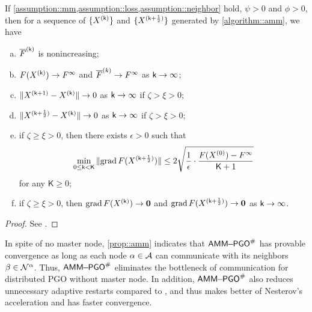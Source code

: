 \begin{prop}\label{prop::amm}
	{\highlight If \cref{assumption::mm,assumption::loss,assumption::neighbor} hold, $\psi>0$ and $\phi>0$,} then for a sequence of  $\{X^{(\sk)}\}$ and $\{X^{(\skh)}\}$  generated by \cref{algorithm::amm}, we have
	\begin{enumerate}[(a)]
		\item\label{prop::amm1}  $\lF^{(\sk)}$  is nonincreasing;
		\item\label{prop::amm2} $F(X^{(\sk)})\rightarrow F^\infty$ and $\lF^{(k)}\rightarrow F^\infty$  as $\sk\rightarrow\infty$;
		\item\label{prop::amm3} $\|\Xkp-\Xk\|\rightarrow 0$ as $\sk\rightarrow\infty$ if $\zeta>\xi>0$;
		\item\label{prop::amm4} $\|\Xkh-\Xk\|\rightarrow 0$ as $\sk\rightarrow\infty$ if $\zeta>\xi>0$;
		\item\label{prop::amm5} if $\zeta \geq\xi>0$, then there exists $\epsilon > 0$ such that 
		\begin{equation}
			\nonumber
			\min\limits_{0\leq\sk< \mathsf{K}}\|\grad\, F(\Xkh)\|\leq 2\sqrt{\frac{1}{\epsilon}\cdot\dfrac{F(X^{(0)})-F^\infty}{{\sK+1}}}
		\end{equation}
		for any $\mathsf{K}\geq 0$;
		\item\label{prop::amm6} if $\zeta \geq\xi>0$, then $\grad\, F(\Xk)\rightarrow \0$ and $\grad\, F(\Xkh)\rightarrow \0$ as $\sk\rightarrow \infty$.
	\end{enumerate}
\end{prop}
\begin{proof}
	See .
\end{proof}

In spite of no master node, \cref{prop::amm} indicates that  $\ammd$  has provable convergence as long as each node $\alpha\in\AA$ can communicate with its neighbors $\beta\in \NN^\alpha$. Thus,  $\ammd$  eliminates the bottleneck of communication for distributed PGO without master node. In addition,  $\ammd$  also reduces unnecessary adaptive restarts compared to \cite{fan2020mm}, and thus makes better of Nesterov's acceleration and has faster convergence.  
